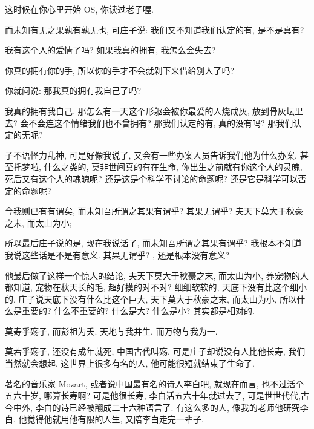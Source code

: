 \documentclass[11pt]{article}
\begin{document}
这时候在你心里开始 OS, 你读过老子喔. 

{\color{blue} 而未知有无之果孰有孰无也}, 可庄子说: 我们又不知道我们认定的有, 是不是真有? 

我有这个人的爱情了吗? 如果我真的拥有, 我怎么会失去? 

你真的拥有你的手, 所以你的手才不会就剁下来借给别人了吗? 

你就问说: 那我真的拥有我自己了吗? 

我真的拥有我自己, 那怎么有一天这个形躯会被你最爱的人烧成灰, 放到骨灰坛里去? 会不会连这个情绪我们也不曾拥有? 那我们认定的有, 真的没有吗? 那我们认定的无呢? 

子不语怪力乱神, 可是好像我说了, 又会有一些办案人员告诉我们他为什么办案, 甚至托梦啦, 什么之类的, 莫非世间真的有在生命, 你出生之前就有你这个人的灵魄, 死后又有这个人的魂魄呢? 还是这是个科学不讨论的命题呢? 还是它是科学可以否定的命题呢? 



\begin{center}
	{\color{magenta} 今我则已有有谓矣, 而未知吾所谓之其果有谓乎? 其果无谓乎? 夫天下莫大于秋豪之末, 而太山为小;}
\end{center}

所以最后庄子说的是, 现在我说话了, {\color{blue} 而未知吾所谓之其果有谓乎? } 我根本不知道我说这些话是不是有意义. {\color{blue} 其果无谓乎? }, 还是根本没有意义? 

他最后做了这样一个惊人的结论,{\color{blue} 夫天下莫大于秋豪之末, 而太山为小}, 养宠物的人都知道, 宠物在秋天长的毛, 超好摸的对不对? 细细软软的, 天底下没有比这个细小的, 庄子说天底下没有什么比这个巨大, {\color{blue} 天下莫大于秋豪之末, 而太山为小}, 所以什么是重要的? 什么不重要的? 什么是大? 什么是小? 其实都是相对的. 
\vspace{-0.5cm}

\begin{center}
	{\color{magenta} 莫寿乎殇子, 而彭祖为夭. 天地与我并生, 而万物与我为一. }
\end{center}

\vspace{-0.5cm}

{\color{blue} 莫若乎殇子}, 还没有成年就死, 中国古代叫殇, 可是庄子却说没有人比他长寿, 我们当然就会想起, 这世界上很多有名的人, 他可能很短就结束了生命了.

著名的音乐家 Mozart, 或者说中国最有名的诗人李白吧, 就现在而言, 也不过活个五六十岁, 哪算长寿啊? 可是他很长寿, 李白活五六十年就过去了, 可是世世代代,古今中外, 李白的诗已经被翻成二十六种语言了. 有这么多的人, 像我的老师他研究李白, 他觉得他就用他有限的人生, 又陪李白走完一辈子.
\end{document}

